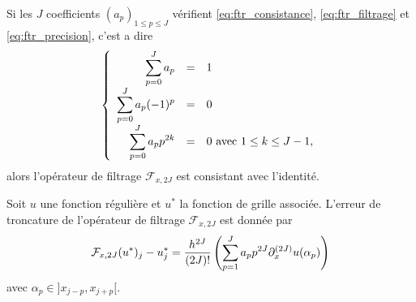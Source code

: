 \begin{proposition}
Si les $J$ coefficients $(a_p)_{1 \leq p \leq J}$ vérifient \eqref{eq:ftr_consistance}, \eqref{eq:ftr_filtrage} et \eqref{eq:ftr_precision}, c'est a dire
\begin{equation}
\left\lbrace
\begin{array}{rcl}
\displaystyle\sum\limits_{p=0}^J a_p & = & 1 \\
\displaystyle\sum\limits_{p=0}^J a_p (-1)^p & = & 0 \\
\displaystyle\sum\limits_{p=0}^J a_p p^{2k} & = & 0 \text{ avec } 1 \leq k \leq J-1,
\end{array}
\right.
\label{eq:system_ftr}
\end{equation}
alors l'opérateur de filtrage $\mathcal{F}_{x,2J}$ est consistant avec l'identité.

Soit $u$ une fonction régulière et $u^*$ la fonction de grille associée. L'erreur de troncature de l'opérateur de filtrage $\mathcal{F}_{x,2J}$ est donnée par
\begin{equation}
\mathcal{F}_{x,2J}(u^*)_j - u^*_j = \dfrac{h^{2J}}{(2J)!} \left( \displaystyle\sum\limits_{p=1}^J a_p p^{2J} \partial_x^{(2J)}u(\alpha_p) \right)
\end{equation}
avec $\alpha_p \in ]x_{j-p}, x_{j+p}[$.
\label{prop:filter_def}
\end{proposition}

